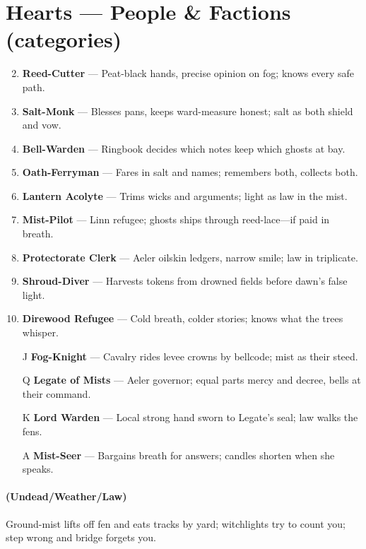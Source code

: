 \section*{Hearts --- People \& Factions (categories)}
\label{sec:mistlands-people}
\begin{enumerate}
\setcounter{enumi}{1}
\item \textbf{Reed-Cutter} --- Peat-black hands, precise opinion on fog; knows every safe path.
\item \textbf{Salt-Monk} --- Blesses pans, keeps ward-measure honest; salt as both shield and vow.
\item \textbf{Bell-Warden} --- Ringbook decides which notes keep which ghosts at bay.
\item \textbf{Oath-Ferryman} --- Fares in salt and names; remembers both, collects both.
\item \textbf{Lantern Acolyte} --- Trims wicks and arguments; light as law in the mist.
\item \textbf{Mist-Pilot} --- Linn refugee; ghosts ships through reed-lace---if paid in breath.
\item \textbf{Protectorate Clerk} --- Aeler oilskin ledgers, narrow smile; law in triplicate.
\item \textbf{Shroud-Diver} --- Harvests tokens from drowned fields before dawn's false light.
\item \textbf{Direwood Refugee} --- Cold breath, colder stories; knows what the trees whisper.
\item[J] \textbf{Fog-Knight} --- Cavalry rides levee crowns by bellcode; mist as their steed.
\item[Q] \textbf{Legate of Mists} --- Aeler governor; equal parts mercy and decree, bells at their command.
\item[K] \textbf{Lord Warden} --- Local strong hand sworn to Legate's seal; law walks the fens.
\item[A] \textbf{Mist-Seer} --- Bargains breath for answers; candles shorten when she speaks.
\end{enumerate}

\paragraph*{(Undead/Weather/Law)} Ground-mist lifts off fen and eats tracks by yard; witchlights try to count you; step wrong and bridge forgets you.


